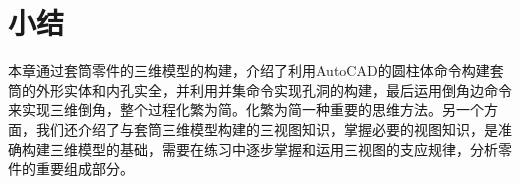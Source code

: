\section{小结}
本章通过套筒零件的三维模型的构建，介绍了利用AutoCAD的圆柱体命令构建套筒的外形实体和内孔实全，并利用并集命令实现孔洞的构建，最后运用倒角边命令来实现三维倒角，整个过程化繁为简。化繁为简一种重要的思维方法。另一个方面，我们还介绍了与套筒三维模型构建的三视图知识，掌握必要的视图知识，是准确构建三维模型的基础，需要在练习中逐步掌握和运用三视图的支应规律，分析零件的重要组成部分。
\endinput